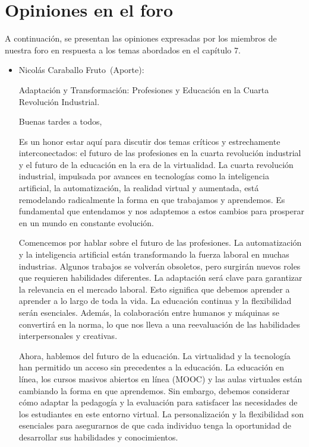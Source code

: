 \documentclass[letterpaper, 12pt]{article}
\newcommand{\memberNicolas}{Nicolás Caraballo Fruto~}
\begin{document}

\section*{Opiniones en el foro}

A continuación, se presentan las opiniones expresadas por
los miembros de nuestra foro en respuesta a los temas
abordados en el capítulo 7.

\begin{itemize}[label=$\triangleright$]
      \item \memberNicolas (Aporte):

            Adaptación y Transformación: Profesiones y Educación en la
            Cuarta Revolución Industrial.

            Buenas tardes a todos,

            Es un honor estar aquí para discutir dos temas críticos y
            estrechamente interconectados: el futuro de las profesiones
            en la cuarta revolución industrial y el futuro de la
            educación en la era de la virtualidad. La cuarta revolución
            industrial, impulsada por avances en tecnologías como la
            inteligencia artificial, la automatización, la realidad
            virtual y aumentada, está remodelando radicalmente la forma
            en que trabajamos y aprendemos. Es fundamental que
            entendamos y nos adaptemos a estos cambios para prosperar
            en un mundo en constante evolución.

            Comencemos por hablar sobre el futuro de las profesiones.
            La automatización y la inteligencia artificial están
            transformando la fuerza laboral en muchas industrias.
            Algunos trabajos se volverán obsoletos, pero surgirán
            nuevos roles que requieren habilidades diferentes. La
            adaptación será clave para garantizar la relevancia en el
            mercado laboral. Esto significa que debemos aprender a
            aprender a lo largo de toda la vida. La educación continua
            y la flexibilidad serán esenciales. Además, la colaboración
            entre humanos y máquinas se convertirá en la norma, lo que
            nos lleva a una reevaluación de las habilidades
            interpersonales y creativas.

            Ahora, hablemos del futuro de la educación. La virtualidad
            y la tecnología han permitido un acceso sin precedentes a
            la educación. La educación en línea, los cursos masivos
            abiertos en línea (MOOC) y las aulas virtuales están
            cambiando la forma en que aprendemos. Sin embargo, debemos
            considerar cómo adaptar la pedagogía y la evaluación para
            satisfacer las necesidades de los estudiantes en este
            entorno virtual. La personalización y la flexibilidad son
            esenciales para asegurarnos de que cada individuo tenga la
            oportunidad de desarrollar sus habilidades y conocimientos.


\end{itemize}
\end{document}
